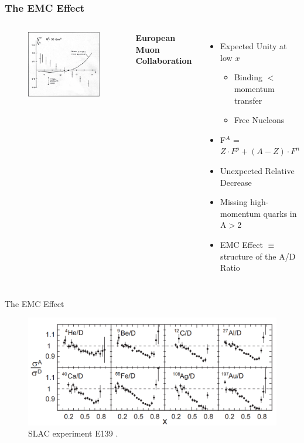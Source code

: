 \documentclass[12pt,usenames,dvipsnames]{beamer}
\begin{document}
\begin{frame}
\frametitle{The EMC Effect}
\begin{columns}[t]
	\vspace{-35pt}
	\begin{figure}
		\includegraphics[width =7cm]{../images/Thesis/EMC.png}
		\caption*{\cite{cc}}
	\end{figure}
	
	\vspace{-1.25cm}	\hspace{-20pt}\textbf{ European Muon Collaboration}
	\pause
	\begin{itemize}
		\item Expected Unity at low $x$ 
				\pause
		\begin{itemize}
			\item Binding $<$ momentum transfer
			\item Free Nucleons
		\end{itemize}

		\item F$^A$ = $Z \cdot F^p + (A-Z)\cdot F^n$  
		\pause
		\item Unexpected Relative Decrease
		\item Missing high-momentum quarks in A$>$2
		\pause
		\item EMC Effect $\equiv$ structure of the A/D Ratio
	\end{itemize}
	
\end{columns}
\end{frame}



\begin{frame}{The EMC Effect}

\begin{figure}
\caption*{\label{EMC_slac} SLAC experiment E139 \cite{slac_emc} .}
\includegraphics[width =12cm]{../images/EMC_slac_horiz.png}
\end{figure}


\end{frame}
\end{document}
